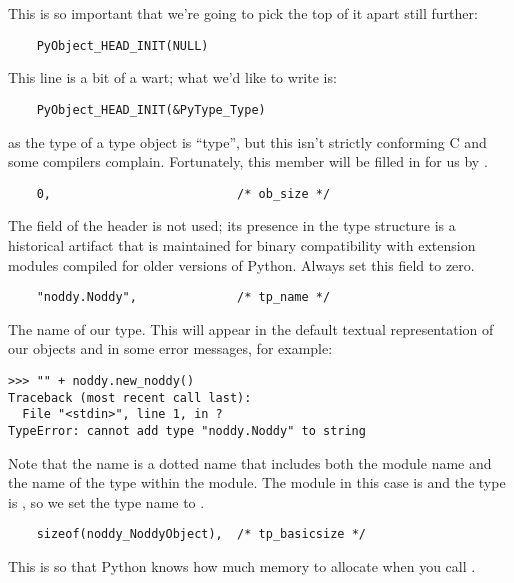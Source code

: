 This is so important that we're going to pick the top of it apart still
further:

\begin{verbatim}
    PyObject_HEAD_INIT(NULL)
\end{verbatim}

This line is a bit of a wart; what we'd like to write is:

\begin{verbatim}
    PyObject_HEAD_INIT(&PyType_Type)
\end{verbatim}

as the type of a type object is ``type'', but this isn't strictly
conforming C and some compilers complain.  Fortunately, this member
will be filled in for us by .

\begin{verbatim}
    0,                          /* ob_size */
\end{verbatim}

The  field of the header is not used; its presence in
the type structure is a historical artifact that is maintained for
binary compatibility with extension modules compiled for older
versions of Python.  Always set this field to zero.

\begin{verbatim}
    "noddy.Noddy",              /* tp_name */
\end{verbatim}

The name of our type.  This will appear in the default textual
representation of our objects and in some error messages, for example:

\begin{verbatim}
>>> "" + noddy.new_noddy()
Traceback (most recent call last):
  File "<stdin>", line 1, in ?
TypeError: cannot add type "noddy.Noddy" to string
\end{verbatim}

Note that the name is a dotted name that includes both the module name
and the name of the type within the module. The module in this case is 
 and the type is , so we set the type name
to .

\begin{verbatim}
    sizeof(noddy_NoddyObject),  /* tp_basicsize */
\end{verbatim}

This is so that Python knows how much memory to allocate when you call
.

